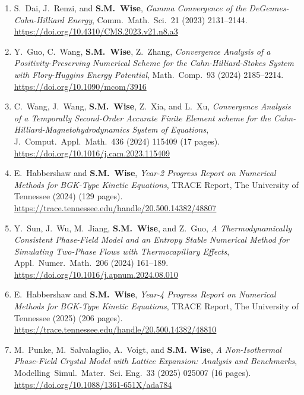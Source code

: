 \documentclass[10pt,letterpaper]{article}
\begin{document}
\begin{enumerate}
	\item
S.~Dai, J.~Renzi, and \textbf{S.M.~Wise}, {\sl Gamma Convergence of the DeGennes-Cahn-Hilliard Energy}, Comm.~Math.~Sci.~21 (2023) 2131--2144.
	\\
\url{https://doi.org/10.4310/CMS.2023.v21.n8.a3}

	\item
Y.~Guo, C.~Wang, \textbf{S.M.~Wise}, Z.~Zhang, {\sl Convergence Analysis of a Positivity-Preserving Numerical Scheme for the Cahn-Hilliard-Stokes System with Flory-Huggins Energy Potential}, Math.~Comp.~93 (2024) 2185--2214.
	\\
\url{https://doi.org/10.1090/mcom/3916}

	\item
C.~Wang, J.~Wang, \textbf{S.M.~Wise}, Z.~Xia, and L.~Xu, {\sl Convergence Analysis of a Temporally Second-Order Accurate Finite Element scheme for the Cahn-Hilliard-Magnetohydrodynamics System of Equations}, J.~Comput.~Appl.~Math.~436 (2024) 115409 (17 pages).
	\\
\url{https://doi.org/10.1016/j.cam.2023.115409}

	\item
E.~Habbershaw and \textbf{S.M.~Wise}, {\sl Year-2 Progress Report on Numerical Methods for BGK-Type Kinetic Equations}, TRACE Report, The University of Tennessee (2024) (129 pages).
 	\\
\url{https://trace.tennessee.edu/handle/20.500.14382/48807}

	\item
Y.~Sun, J.~Wu, M.~Jiang, \textbf{S.M.~Wise}, and Z.~Guo, {\sl A Thermodynamically Consistent Phase-Field Model and an Entropy Stable Numerical Method for Simulating Two-Phase Flows with Thermocapillary Effects}, Appl.~Numer.~Math.~206 (2024) 161--189.
	\\
\url{https://doi.org/10.1016/j.apnum.2024.08.010}

	\item
E.~Habbershaw and \textbf{S.M.~Wise}, {\sl Year-4 Progress Report on Numerical Methods for BGK-Type Kinetic Equations}, TRACE Report, The University of Tennessee (2025) (206 pages).
	\\
\url{https://trace.tennessee.edu/handle/20.500.14382/48810}

	\item
M.~Punke, M.~Salvalaglio, A.~Voigt, and \textbf{S.M. Wise}, {\sl A Non-Isothermal Phase-Field Crystal Model with Lattice Expansion: Analysis and Benchmarks}, Modelling~Simul.~Mater.~Sci. Eng.~33 (2025) 025007 (16 pages). 
	\\
\url{https://doi.org/10.1088/1361-651X/ada784}


\end{enumerate}
\end{document}
